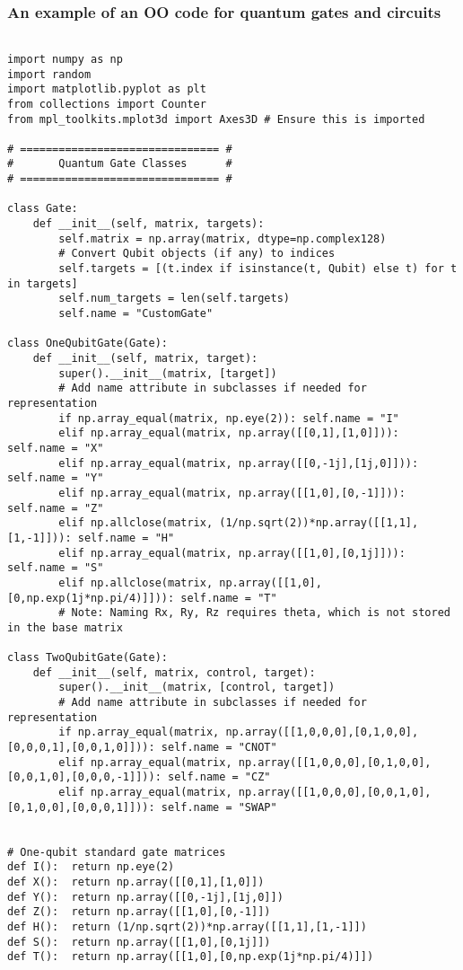 \documentclass{beamer}
\begin{document}
\begin{frame}
\frametitle{An example of an OO  code for quantum gates and circuits}

\begin{verbatim}

import numpy as np
import random
import matplotlib.pyplot as plt
from collections import Counter
from mpl_toolkits.mplot3d import Axes3D # Ensure this is imported

# =============================== #
#       Quantum Gate Classes      #
# =============================== #

class Gate:
    def __init__(self, matrix, targets):
        self.matrix = np.array(matrix, dtype=np.complex128)
        # Convert Qubit objects (if any) to indices
        self.targets = [(t.index if isinstance(t, Qubit) else t) for t in targets]
        self.num_targets = len(self.targets)
        self.name = "CustomGate"

class OneQubitGate(Gate):
    def __init__(self, matrix, target):
        super().__init__(matrix, [target])
        # Add name attribute in subclasses if needed for representation
        if np.array_equal(matrix, np.eye(2)): self.name = "I"
        elif np.array_equal(matrix, np.array([[0,1],[1,0]])): self.name = "X"
        elif np.array_equal(matrix, np.array([[0,-1j],[1j,0]])): self.name = "Y"
        elif np.array_equal(matrix, np.array([[1,0],[0,-1]])): self.name = "Z"
        elif np.allclose(matrix, (1/np.sqrt(2))*np.array([[1,1],[1,-1]])): self.name = "H"
        elif np.array_equal(matrix, np.array([[1,0],[0,1j]])): self.name = "S"
        elif np.allclose(matrix, np.array([[1,0],[0,np.exp(1j*np.pi/4)]])): self.name = "T"
        # Note: Naming Rx, Ry, Rz requires theta, which is not stored in the base matrix

class TwoQubitGate(Gate):
    def __init__(self, matrix, control, target):
        super().__init__(matrix, [control, target])
        # Add name attribute in subclasses if needed for representation
        if np.array_equal(matrix, np.array([[1,0,0,0],[0,1,0,0],[0,0,0,1],[0,0,1,0]])): self.name = "CNOT"
        elif np.array_equal(matrix, np.array([[1,0,0,0],[0,1,0,0],[0,0,1,0],[0,0,0,-1]])): self.name = "CZ"
        elif np.array_equal(matrix, np.array([[1,0,0,0],[0,0,1,0],[0,1,0,0],[0,0,0,1]])): self.name = "SWAP"


# One-qubit standard gate matrices
def I():  return np.eye(2)
def X():  return np.array([[0,1],[1,0]])
def Y():  return np.array([[0,-1j],[1j,0]])
def Z():  return np.array([[1,0],[0,-1]])
def H():  return (1/np.sqrt(2))*np.array([[1,1],[1,-1]])
def S():  return np.array([[1,0],[0,1j]])
def T():  return np.array([[1,0],[0,np.exp(1j*np.pi/4)]])


\end{verbatim}
\end{frame}
\end{document}
